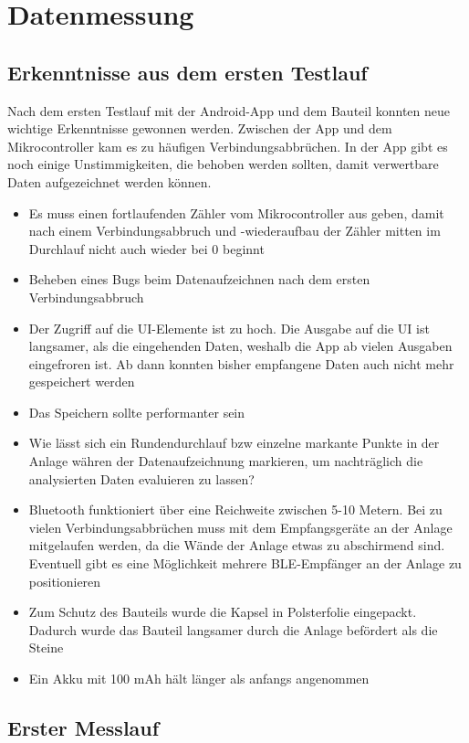 \section{Datenmessung}

\subsection{Erkenntnisse aus dem ersten Testlauf}
Nach dem ersten Testlauf mit der Android-App und dem Bauteil konnten neue wichtige Erkenntnisse gewonnen werden.
Zwischen der App und dem Mikrocontroller kam es zu häufigen Verbindungsabbrüchen. In der App gibt es noch einige Unstimmigkeiten, die behoben werden sollten, damit verwertbare Daten aufgezeichnet werden können. 

\begin{itemize}
	\item Es muss einen fortlaufenden Zähler vom Mikrocontroller aus geben, damit nach einem Verbindungsabbruch und -wiederaufbau der Zähler mitten im Durchlauf nicht auch wieder bei 0 beginnt
	\item Beheben eines Bugs beim Datenaufzeichnen nach dem ersten Verbindungsabbruch
	\item Der Zugriff auf die UI-Elemente ist zu hoch. Die Ausgabe auf die UI ist langsamer, als die eingehenden Daten, weshalb die App ab vielen Ausgaben eingefroren ist. Ab dann konnten bisher empfangene Daten auch nicht mehr gespeichert werden
	\item Das Speichern sollte performanter sein
	\item Wie lässt sich ein Rundendurchlauf bzw einzelne markante Punkte in der Anlage währen der Datenaufzeichnung markieren, um nachträglich die analysierten Daten evaluieren zu lassen?
	\item Bluetooth funktioniert über eine Reichweite zwischen 5-10 Metern. Bei zu vielen Verbindungsabbrüchen muss mit dem Empfangsgeräte an der Anlage mitgelaufen werden, da die Wände der Anlage etwas zu abschirmend sind. Eventuell gibt es eine Möglichkeit mehrere BLE-Empfänger an der Anlage zu positionieren
	\item Zum Schutz des Bauteils wurde die Kapsel in Polsterfolie eingepackt. Dadurch wurde das Bauteil langsamer durch die Anlage befördert als die Steine
	\item Ein Akku mit 100 mAh hält länger als anfangs angenommen
\end{itemize}

\subsection{Erster Messlauf}


